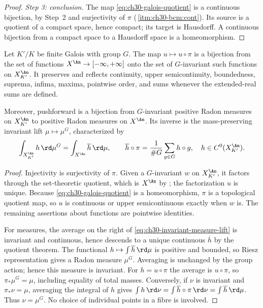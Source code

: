 \begin{proof}
\emph{Step 3: conclusion.}  The map \eqref{eq:ch30-galois-quotient} is a
continuous bijection, by Step~2 and surjectivity of $\pi$
(\,\cref{itm:ch30-bcm:cont}).  Its source is a
quotient of a compact space, hence compact; its target is Hausdorff.  A
continuous bijection from a compact space to a Hausdorff space is a
homeomorphism.
\end{proof}

\begin{corollary}
\label{cor:ch30-invariant-functions}
Let $K'/K$ be finite Galois with group $G$.  The map
$u\mapsto u\circ\pi$ is a bijection from the set of functions
$X^{\An}\to[-\infty,+\infty]$ onto the set of $G$-invariant such
functions on $X_{K'}^{\An}$.  It preserves and reflects continuity, upper
semicontinuity, boundedness, suprema, infima, maxima, pointwise order,
and sums whenever the extended-real sums are defined.

Moreover, pushforward is a bijection from $G$-invariant positive Radon
measures on $X_{K'}^{\An}$ to positive Radon measures on $X^{\An}$.
Its inverse is the mass-preserving invariant lift $\mu\mapsto\mu^G$,
characterized by
\begin{equation}
\label{eq:ch30-invariant-measure-lift}
 \int_{X_{K'}^{\An}}h\,\rd\mu^G
 =\int_{X^{\An}}\overline h\,\rd\mu,\qquad
 \overline h\circ\pi=\frac1{\#G}\sum_{g\in G}h\circ g,
 \quad h\in C^0(X_{K'}^{\An}).
\end{equation}
\end{corollary}

\begin{proof}
Injectivity is surjectivity of $\pi$.  Given a $G$-invariant $w$ on
$X_{K'}^{\An}$, it factors through the set-theoretic quotient, which is
$X^{\An}$ by ; the factorization
$u$ is unique.  Because \eqref{eq:ch30-galois-quotient} is a
homeomorphism, $\pi$ is a topological quotient map, so $u$ is continuous
or upper semicontinuous exactly when $w$ is.  The remaining assertions
about functions are pointwise identities.

For measures, the average on the right of
\eqref{eq:ch30-invariant-measure-lift} is invariant and continuous, hence
descends to a unique continuous $\overline h$ by the quotient theorem.
The functional $h\mapsto\int\overline h\,\rd\mu$ is positive and
bounded, so Riesz representation gives a Radon measure $\mu^G$.
Averaging is unchanged by the group action; hence this measure is
invariant.  For $h=u\circ\pi$ the average is $u\circ\pi$, so
$\pi_*\mu^G=\mu$, including equality of total masses.
Conversely, if $\nu$ is invariant and $\pi_*\nu=\mu$, averaging the
integral of $h$ gives
$\int h\,\rd\nu=\int\overline h\circ\pi\,\rd\nu
=\int\overline h\,\rd\mu$.  Thus $\nu=\mu^G$.
No choice of individual points in a fibre is involved.
\end{proof}

